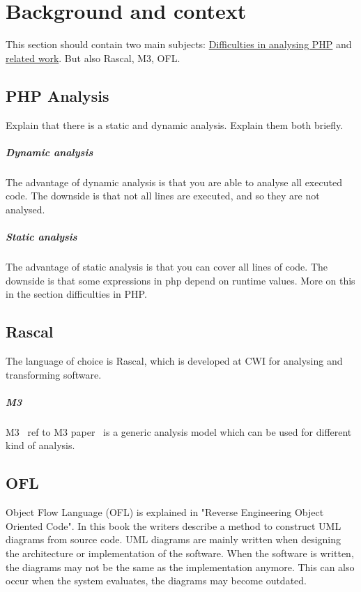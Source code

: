 \documentclass[../main.tex]{subfiles}
\begin{document}
    \chapter{Background and context}\label{chap:background}
    This section should contain two main subjects: \underline{Difficulties in analysing PHP} and \underline{related work}. But also Rascal, M3, OFL.
    \section{PHP Analysis}
    Explain that there is a static and dynamic analysis. Explain them both briefly.
        \paragraph{Dynamic analysis}
            The advantage of dynamic analysis is that you are able to analyse all executed code. 
            The downside is that not all lines are executed, and so they are not analysed.
        \paragraph{Static analysis}
            The advantage of static analysis is that you can cover all lines of code.
            The downside is that some expressions in php depend on runtime values. More on this in the section difficulties in PHP.
            
    \section{Rascal}
        The language of choice is Rascal, which is developed at CWI for analysing and transforming software.
        \paragraph{M3}
            M3 ~ref to M3 paper~ is a generic analysis model which can be used for different kind of analysis.

    \section{OFL}
    Object Flow Language (OFL) is explained in "Reverse Engineering Object Oriented Code". 
    In this book the writers describe a method to construct UML diagrams from source code.
    UML diagrams are mainly written when designing the architecture or implementation of the software.
    When the software is written, the diagrams may not be the same as the implementation anymore.
    This can also occur when the system evaluates, the diagrams may become outdated.
    
\end{document}

